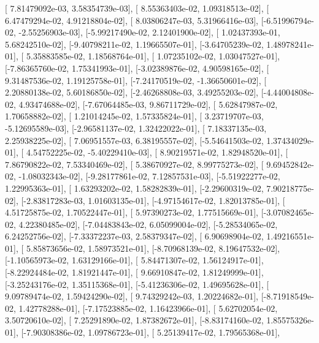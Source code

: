 \documentclass{article}
\begin{document}
       [ 7.81479092e-03,  3.58354739e-03],
       [ 8.55363403e-02,  1.09318513e-02],
       [ 6.47479294e-02,  4.91218804e-02],
       [ 8.03806247e-03,  5.31966416e-03],
       [-6.51996794e-02, -2.55256903e-03],
       [-5.99217490e-02,  2.12401900e-02],
       [ 1.02437393e-01,  5.68242510e-02],
       [-9.40798211e-02,  1.19665507e-01],
       [-3.64705239e-02,  1.48978241e-01],
       [ 5.35883585e-02,  1.18568764e-01],
       [ 1.07235102e-02,  1.03047527e-01],
       [-7.86365760e-02,  1.75341993e-01],
       [-3.02389876e-02,  4.90598165e-02],
       [ 9.31487536e-02,  1.19125758e-01],
       [-7.24170519e-02, -1.36650601e-02],
       [ 2.20880138e-02,  5.60186850e-02],
       [-2.46268808e-03,  3.49255203e-02],
       [-4.44004808e-02,  4.93474688e-02],
       [-7.67064485e-03,  9.86711729e-02],
       [ 5.62847987e-02,  1.70658882e-02],
       [ 1.21014245e-02,  1.57335824e-01],
       [ 3.23719707e-03, -5.12695589e-03],
       [-2.96581137e-02,  1.32422022e-01],
       [ 7.18337135e-03,  2.25938225e-02],
       [ 7.06951557e-03,  6.38195557e-02],
       [-5.54641503e-02,  1.37434029e-01],
       [ 4.54752225e-02, -5.40229410e-03],
       [ 8.90219571e-02,  1.82948520e-01],
       [ 7.86790822e-02,  7.53340469e-02],
       [ 5.38670927e-02,  8.99775273e-02],
       [ 9.69452842e-02, -1.08032343e-02],
       [-9.28177861e-02,  7.12857531e-03],
       [-5.51922277e-02,  1.22995363e-01],
       [ 1.63293202e-02,  1.58282839e-01],
       [-2.29600319e-02,  7.90218775e-02],
       [-2.83817283e-03,  1.01603135e-01],
       [-4.97154617e-02,  1.82013785e-01],
       [ 4.51725875e-02,  1.70522447e-01],
       [ 5.97390273e-02,  1.77515669e-01],
       [-3.07082465e-02,  4.22380485e-02],
       [-7.04483843e-02,  6.05099004e-02],
       [-5.28534065e-02,  6.24252756e-02],
       [-7.33372237e-03,  2.58379347e-02],
       [ 6.90698904e-02,  1.49216551e-01],
       [ 5.85873656e-02,  1.58973521e-01],
       [-8.70968139e-02,  8.19647532e-02],
       [-1.10565973e-02,  1.63129166e-01],
       [ 5.84471307e-02,  1.56124917e-01],
       [-8.22924484e-02,  1.81921447e-01],
       [ 9.66910847e-02,  1.81249999e-01],
       [-3.25243176e-02,  1.35115368e-01],
       [-5.41236306e-02,  1.49695628e-01],
       [ 9.09789474e-02,  1.59424290e-02],
       [ 9.74329242e-03,  1.20224682e-01],
       [-8.71918549e-02,  1.42778288e-01],
       [-7.17523885e-02,  1.16423966e-01],
       [ 5.62702054e-02,  3.50720610e-02],
       [ 7.25291890e-02,  1.87382672e-01],
       [-8.83174160e-02,  1.85575326e-01],
       [-7.90308386e-02,  1.09786723e-01],
       [ 5.25139417e-02,  1.79565368e-01],
\end{document}
